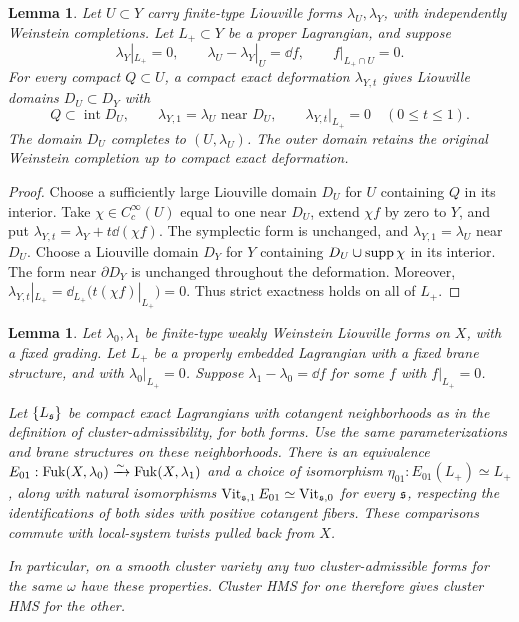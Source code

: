 \documentclass[12pt, letter]{amsart}
\newtheorem{lemma}[theorem]{Lemma}
\theoremstyle{definition}
\DeclareMathOperator{\Vit}{Vit}
\numberwithin{equation}{section}
\begin{document}
\begin{lemma}\label{lem:actual-transfer}
Let $U\subset Y$ carry finite-type Liouville forms
$\lambda_U,\lambda_Y$, with independently Weinstein completions.
Let $L_+\subset Y$ be a proper Lagrangian, and suppose
\[
 \lambda_Y|_{L_+}=0,\qquad
 \lambda_U-\lambda_Y|_U=\dd f,\qquad
 f|_{L_+\cap U}=0.
\]
For every compact $Q\subset U$, a compact exact deformation
$\lambda_{Y,t}$ gives Liouville domains $D_U\subset D_Y$ with
\[
 Q\subset\operatorname{int}D_U,\qquad
 \lambda_{Y,1}=\lambda_U\text{ near }D_U,\qquad
 \lambda_{Y,t}|_{L_+}=0\quad(0\le t\le1).
\]
The domain $D_U$ completes to $(U,\lambda_U)$.
The outer domain retains the original Weinstein completion up to
compact exact deformation.
\end{lemma}
\begin{proof}
Choose a sufficiently large Liouville domain $D_U$ for $U$ containing
$Q$ in its interior. Take $\chi\in C_c^\infty(U)$ equal to one
near $D_U$, extend $\chi f$ by zero to $Y$, and put
$
 \lambda_{Y,t}=\lambda_Y+t\dd(\chi f).
$
The symplectic form is unchanged, and
$\lambda_{Y,1}=\lambda_U$ near $D_U$.
Choose a Liouville domain $D_Y$ for $Y$ containing
$D_U\cup\operatorname{supp}\chi$ in its interior.
The form near $\partial D_Y$ is unchanged throughout the deformation.
Moreover,
$
 \lambda_{Y,t}|_{L_+}
 =\dd_{L_+}\bigl(t(\chi f)|_{L_+}\bigr)=0.
$
Thus strict exactness holds on all of $L_+$.
\end{proof}

\begin{lemma}\label{lem:change-primitive}
Let $\lambda_0,\lambda_1$ be finite-type weakly Weinstein Liouville
forms on $X$, with a fixed grading.  Let $L_+$ be a properly embedded Lagrangian with a fixed brane structure, and with $\lambda_0|_{L_+}=0$. 
Suppose 
$\lambda_1-\lambda_0=\dd f$ for some $f$ with $f|_{L_+}=0$.

Let $\{L_{\mathfrak{s}}\}$ be compact exact Lagrangians with cotangent neighborhoods
as in the definition of cluster-admissibility, for both forms.
Use the same parameterizations and brane structures on these neighborhoods.
There is an equivalence $E_{01}:\operatorname{Fuk}(X,\lambda_0)\xrightarrow{\sim}\operatorname{Fuk}(X,\lambda_1)$ and a choice of isomorphism $\eta_{01}:
 E_{01}(L_+)\simeq L_+$, along with
natural isomorphisms
$
 \Vit_{\fs,1}E_{01}\simeq\Vit_{\fs,0}
$
for every $\mathfrak{s}$, respecting the identifications of both sides with  positive
cotangent fibers. These comparisons commute with local-system twists
pulled back from $X$.

In particular, on a smooth cluster variety any two cluster-admissible
forms for the same $\omega$ have these properties. Cluster HMS for one
therefore gives cluster HMS for the other. 
\end{lemma}
\end{document}
